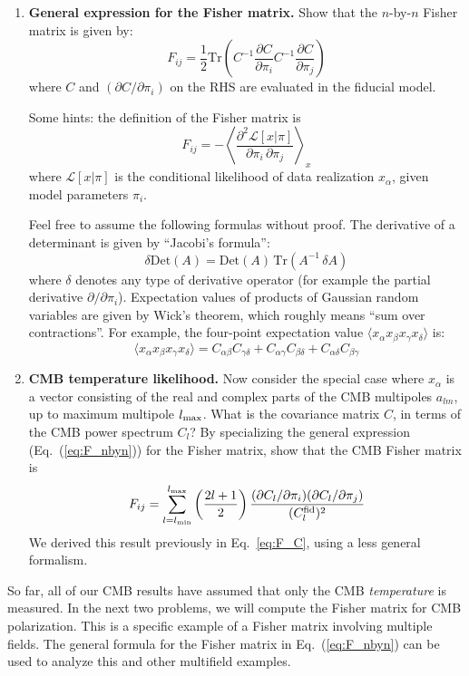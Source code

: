 \documentclass[aps,prd,superscriptaddress,groupedaddress,nofootinbib,nobibnotes]{revtex4}
\newcommand{\be}{\begin{equation}}
\newcommand{\ee}{\end{equation}}
\def\L{{\mathcal L}}
\begin{document}
\begin{enumerate}

\item {\bf General expression for the Fisher matrix.}
Show that the $n$-by-$n$ Fisher matrix is given by:
\be
F_{ij} = \frac{1}{2} \mbox{Tr} \left( C^{-1} \frac{\partial C}{\partial\pi_i} C^{-1} \frac{\partial C}{\partial\pi_j} \right)  \label{eq:F_nbyn}
\ee
where $C$ and $(\partial C / \partial\pi_i)$ on the RHS are evaluated in the fiducial model.

Some hints: the definition of the Fisher matrix is
\be
F_{ij} = -\left\langle \frac{\partial^2 \L[x|\pi]}{\partial\pi_i \, \partial\pi_j} \right\rangle_x
\ee
where $\L[x|\pi]$ is the conditional likelihood of data realization $x_\alpha$, given model parameters $\pi_i$.

Feel free to assume the following formulas without proof.
The derivative of a determinant is given by ``Jacobi's formula'':
\be
\delta \mbox{Det}(A) = \mbox{Det}(A) \, \mbox{Tr}(A^{-1} \, \delta A)
\ee
where $\delta$ denotes any type of derivative operator (for example the partial derivative $\partial/\partial\pi_i$).
Expectation values of products of Gaussian random variables are given by Wick's theorem, which roughly means ``sum over
contractions''.  For example, the four-point expectation value $\langle x_\alpha x_\beta x_\gamma x_\delta \rangle$ is:
\be
\langle x_\alpha x_\beta x_\gamma x_\delta \rangle = C_{\alpha\beta} C_{\gamma\delta} + C_{\alpha\gamma} C_{\beta\delta} + C_{\alpha\delta} C_{\beta\gamma}
\ee

\item {\bf CMB temperature likelihood.}
Now consider the special case where $x_\alpha$ is a vector consisting of the real and complex parts of the CMB multipoles $a_{lm}$,
up to maximum multipole $l_{\rm max}$.  What is the covariance matrix $C$, in terms of the CMB power spectrum $C_l$?  By specializing
the general expression (Eq.~(\ref{eq:F_nbyn})) for the Fisher matrix, show that the CMB Fisher matrix is
\be
F_{ij} = \sum_{l=l_{\rm min}}^{l_{\rm max}} \left( \frac{2l+1}{2} \right) \frac{(\partial C_l / \partial\pi_i)(\partial C_l/\partial\pi_j)}{(C_l^{\rm fid})^2}
\ee
We derived this result previously in Eq.~\ref{eq:F_C}, using a less general formalism.
\setcounter{enumi_save}{\value{enumi}}
\end{enumerate}

\par\noindent
So far, all of our CMB results have assumed that only the CMB {\em temperature} is measured.
In the next two problems, we will compute the Fisher matrix for CMB polarization.
This is a specific example of a Fisher matrix involving multiple fields.
The general formula for the Fisher matrix in Eq.~(\ref{eq:F_nbyn}) can be used to analyze
this and other multifield examples.
\end{document}
